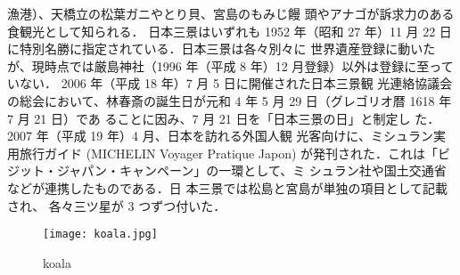 \documentclass[twocolumn]{jarticle}
\begin{document}
漁港）、天橋立の松葉ガニやとり貝、宮島のもみじ饅
頭やアナゴが訴求力のある食観光として知られる．
日本三景はいずれも 1952 年（昭和 27 年）11 月 22 日
に特別名勝に指定されている．日本三景は各々別々に
世界遺産登録に動いたが、現時点では厳島神社（1996
年（平成 8 年）12 月登録）以外は登録に至っていない．
2006 年（平成 18 年）7 月 5 日に開催された日本三景観
光連絡協議会の総会において、林春斎の誕生日が元和
4 年 5 月 29 日（グレゴリオ暦 1618 年 7 月 21 日）であ
ることに因み、7 月 21 日を「日本三景の日」と制定し
た．2007 年（平成 19 年）4 月、日本を訪れる外国人観
光客向けに、ミシュラン実用旅行ガイド (MICHELIN
Voyager Pratique Japon) が発刊された．これは「ビ
ジット・ジャパン・キャンペーン」の一環として、ミ
シュラン社や国土交通省などが連携したものである．日
本三景では松島と宮島が単独の項目として記載され、
各々三ツ星が 3 つずつ付いた．
\begin{figure}[htbp]
    \begin{center}
    \texttt{[image: koala.jpg]}
    \caption{ koala}
    \end{center}
    \end{figure}\\
\end{document}

